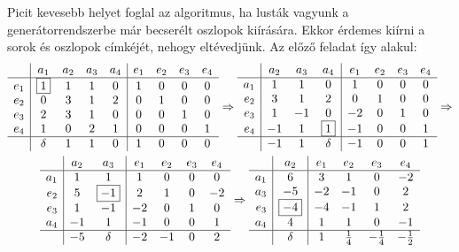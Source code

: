 \documentclass[9pt, a4paper, showtrims]{memoir}
\theoremstyle{plain}
\theoremstyle{remark}
\theoremstyle{definition}
\begin{document}
Picit kevesebb helyet foglal az algoritmus, ha lusták vagyunk a generátorrendszerbe már becserélt 
oszlopok kiírására. 
Ekkor érdemes kiírni a sorok és oszlopok címkéjét, nehogy eltévedjünk.
Az előző feladat így alakul:
\begin{multline*}
    \begin{array}{r|cccc|cccc}
        &a_1&a_2&a_3&a_4&e_1&e_2&e_3&e_4\\
        \hline
        e_1&\boxed{1}&1&1&0 & 1&0&0&0\\
        e_2&0&3&1&2 & 0&1&0&0\\
        e_3&2&3&1&0 & 0&0&1&0\\
        e_4&1&0&2&1 & 0&0&0&1\\
        \hline
        &\delta&1&1&0&1&0&0&0
    \end{array}\Rightarrow
    \begin{array}{r|ccc|cccc}
        &a_2&a_3&a_4&e_1&e_2&e_3&e_4\\
        \hline
        a_1&1&1&0 & 1&0&0&0\\
        e_2&3&1&2 & 0&1&0&0\\
        e_3&1&-1&0 & -2&0&1&0\\
        e_4&-1&1&\boxed{1} & -1&0&0&1\\
        \hline
        &-1&1&\delta&-1&0&0&1
    \end{array}\Rightarrow
    \\
    \begin{array}{r|cc|cccc}
        &a_2&a_3&e_1&e_2&e_3&e_4\\
        \hline
        a_1& 1& 1&  1& 0& 0& 0\\
        e_2& 5& \boxed{-1}&  2& 1& 0& -2\\
        e_3& 1&-1& -2& 0& 1& 0\\
        a_4&-1& 1& -1& 0& 0& 1\\
        \hline
        &-5&\delta&-2&-1&0&2
    \end{array}\Rightarrow
    \begin{array}{r|c|cccc}
        &a_2&e_1&e_2&e_3&e_4\\
        \hline
        a_1&           6&   3& 1& 0& -2\\
        a_3&          -5&  -2&-1& 0&  2\\
        e_3&\boxed{-4}  &  -4&-1& 1&  2\\
        a_4&           4&   1& 1& 0& -1\\
        \hline
        &\delta      &   1&\frac{1}{4}&-\frac{1}{4}&-\frac{1}{2}

\end{array}
\end{multline*}
\end{document}
